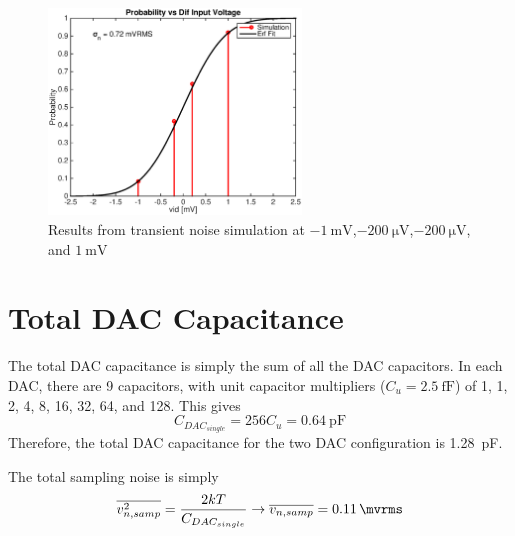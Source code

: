 \documentclass[letterpaper, notitlepage]{revtex4-1}
\begin{document}
\begin{figure}[h]
\begin{center}
\includegraphics[width=0.6\textwidth]{Part_G.eps}
\caption{Results from transient noise simulation at $\SI{-1}{\milli\volt}$,$\SI{-200}{\micro\volt}$,$\SI{-200}{\micro\volt}$, and $\SI{1}{\milli\volt}$}
\label{fig:TransientNoise}
\end{center}
\end{figure}
\section{Total DAC Capacitance}
The total DAC capacitance is simply the sum of all the DAC capacitors. In each DAC, there are 9 capacitors, with unit capacitor multipliers ($C_u=\SI{2.5}{\femto\farad}$) of 1, 1, 2, 4, 8, 16, 32, 64, and 128. This gives
\begin{equation}
C_{DAC_{single}}=256C_u=\SI{0.64}{\pico\farad}
\end{equation}
Therefore, the total DAC capacitance for the two DAC configuration is \SI{1.28}{\pico\farad}.

The total sampling noise is simply
\begin{equation}
\overline{v_{n,samp}^2}=\frac{2kT}{C_{DAC_{single}}}\rightarrow\overline{v_{n,samp}}=\SI{0.11}{\mvrms}
\end{equation}


\end{document}
